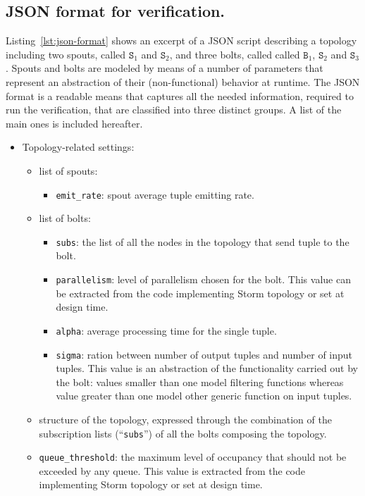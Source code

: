 {\color{blue}
\subsection{JSON format for verification.}
Listing~\ref{lst:json-format} shows an excerpt of a JSON script describing a topology including two spouts, called $\mathtt{S}_1$ and $\mathtt{S}_2$, and three bolts, called called $\mathtt{B}_1$, $\mathtt{S}_2$ and $\mathtt{S}_3$.
Spouts and bolts are modeled by means of a number of parameters that represent an abstraction of their (non-functional) behavior at runtime.
The JSON format is a readable means that captures all the needed information,  required to run the verification, that are classified into three distinct groups.
A list of the main ones is included hereafter.
\begin{itemize}
	\item Topology-related settings:
	\begin{itemize}
		\item list of spouts:
		\begin{itemize}
			\item \texttt{emit\_rate}: spout average tuple emitting rate.
		\end{itemize}
		\item list of bolts:
		\begin{itemize}
			\item \texttt{subs}: the list of all the nodes in the topology that send tuple to the bolt.
			\item \texttt{parallelism}: level of parallelism chosen for the bolt. This value can be extracted from the code implementing Storm topology or set at design time.
			\item \texttt{alpha}: average processing time for the single tuple.
			\item \texttt{sigma}: ration between number of output tuples and number of input tuples. This value is an abstraction of the functionality carried out by the bolt: values smaller than one model filtering functions whereas value greater than one model other generic function on input tuples.
		\end{itemize}
		\item structure of the topology, expressed through the combination of the subscription lists (``\texttt{subs}'') of all the bolts composing the topology.
		\item \texttt{queue\_threshold}: the maximum level of occupancy that should not be exceeded by any queue. This value is extracted from the code implementing Storm topology or set at design time.

\end{itemize}
\end{itemize}}
